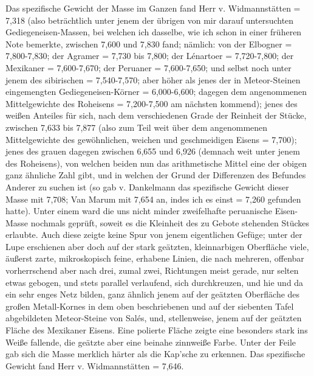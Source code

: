 \documentclass[a4paper, 11pt, oneside, german]{article}
\begin{document}
Das spezifische Gewicht der Masse im Ganzen fand Herr v. Widmannstätten = 7,318 (also beträchtlich unter jenem der übrigen von mir darauf untersuchten Gediegeneisen-Massen, bei welchen ich dasselbe, wie ich schon in einer früheren Note bemerkte, zwischen 7,600 und 7,830 fand; nämlich: von der Elbogner = 7,800-7,830; der Agramer = 7,730 bis 7,800; der Lénartoer = 7,720-7,800; der Mexikaner = 7,600-7,670; der Peruaner = 7,600-7,650; und selbst noch unter jenem des sibirischen = 7,540-7,570; aber höher als jenes der in Meteor-Steinen eingemengten Gediegeneisen-Körner = 6,000-6,600; dagegen dem angenommenen Mittelgewichte des Roheisens = 7,200-7,500 am nächsten kommend); jenes des weißen Anteiles für sich, nach dem verschiedenen Grade der Reinheit der Stücke, zwischen 7,633 bis 7,877 (also zum Teil weit über dem angenommenen Mittelgewichte des gewöhnlichen, weichen und geschmeidigen Eisens = 7,700); jenes des grauen dagegen zwischen 6,655 und 6,926 (demnach weit unter jenem des Roheisens), von welchen beiden nun das arithmetische Mittel eine der obigen ganz ähnliche Zahl gibt, und in welchen der Grund der Differenzen des Befundes Anderer zu suchen ist (so gab v. Dankelmann das spezifische Gewicht dieser Masse mit 7,708; Van Marum mit 7,654 an, indes ich es einst = 7,260 gefunden hatte).  
Unter einem ward die uns nicht minder zweifelhafte peruanische Eisen-Masse nochmals geprüft, soweit es die Kleinheit des zu Gebote stehenden Stückes erlaubte. Auch diese zeigte keine Spur von jenem eigentlichen Gefüge; unter der Lupe erschienen aber doch auf der stark geätzten, kleinnarbigen Oberfläche viele, äußerst zarte, mikroskopisch feine, erhabene Linien, die nach mehreren, offenbar vorherrschend aber nach drei, zumal zwei, Richtungen meist gerade, nur selten etwas gebogen, und stets parallel verlaufend, sich durchkreuzen, und hie und da ein sehr enges Netz bilden, ganz ähnlich jenem auf der geätzten Oberfläche des großen Metall-Kornes in dem oben beschriebenen und auf der siebenten Tafel abgebildeten Meteor-Steine von Salés, und, stellenweise, jenem auf der geätzten Fläche des Mexikaner Eisens. Eine polierte Fläche zeigte eine besonders stark ins Weiße fallende, die geätzte aber eine beinahe zinnweiße Farbe. Unter der Feile gab sich die Masse merklich härter als die Kap'sche zu erkennen. Das spezifische Gewicht fand Herr v. Widmannstätten = 7,646.  
\end{document}
